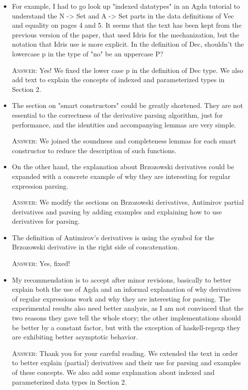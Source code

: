 \documentclass{article}
\begin{document}
\begin{itemize}
    
    \item For example, I had to go look up "indexed datatypes" in an Agda tutorial
    to understand the N -> Set and A -> Set parts in the data definitions of Vec
    and equality on pages 4 and 5. It seems that the text has been kept from
    the previous version of the paper, that used Idris for the mechanization,
    but the notation that Idris use is more explicit. In the definition of Dec,
    shouldn't the lowercase p in the type of "no" be an uppercase P?

    \textsc{Answer}: Yes! We fixed the lower case p in the definition of Dec type.
    We also add text to explain the concepts of indexed and parameterized types in
    Section 2.

    \item The section on "smart constructors" could be greatly shortened. They are
    not essential to the correctness of the derivative parsing algorithm,
    just for performance, and the identities and accompanying lemmas are
    very simple.

    \textsc{Answer}: We joined the soundness and completeness lemmas for each smart constructor to
    reduce the description of such functions.

    \item On the other hand, the explanation about Brzozowski derivatives could
    be expanded with a concrete example of why they are interesting for
    regular expression parsing.

    \textsc{Answer}: We modify the sections on Brzozowski derivatives, Antimirov partial derivatives 
    and parsing by adding examples and explaining how to use derivatives for parsing.

    \item The definition of Antimirov's derivatives is using the symbol for
    the Brzozowski derivative in the right side of concatenation.

    \textsc{Answer}: Yes, fixed!

    \item My recommendation is to accept after minor revisions, basically to
    better explain both the use of Agda and an informal explanation of why
    derivatives of regular expressions work and why they are interesting
    for parsing. The experimental results also need better analysis, as
    I am not convinced that the two reasons they gave tell the whole story;
    the other implementations should be better by a constant factor, but
    with the exception of haskell-regexp they are exhibiting better asymptotic
    behavior.

    \textsc{Answer}: Thank you for your careful reading. We extended the text in order
    to better explain (partial) derivatives and their use
    for parsing and examples of these concepts. We also add some explanation about
    indexed and parameterized data types in Section 2.
\end{itemize}    
\end{document}
